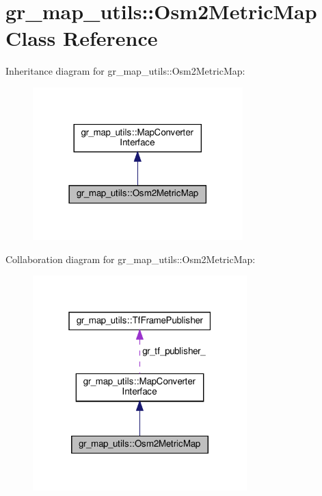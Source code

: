 \hypertarget{classgr__map__utils_1_1Osm2MetricMap}{}\section{gr\+\_\+map\+\_\+utils\+:\+:Osm2\+Metric\+Map Class Reference}
\label{classgr__map__utils_1_1Osm2MetricMap}


Inheritance diagram for gr\+\_\+map\+\_\+utils\+:\+:Osm2\+Metric\+Map\+:
\nopagebreak
\begin{figure}[H]
\begin{center}
\leavevmode
\includegraphics[width=230pt]{classgr__map__utils_1_1Osm2MetricMap__inherit__graph}
\end{center}
\end{figure}


Collaboration diagram for gr\+\_\+map\+\_\+utils\+:\+:Osm2\+Metric\+Map\+:
\nopagebreak
\begin{figure}[H]
\begin{center}
\leavevmode
\includegraphics[width=235pt]{classgr__map__utils_1_1Osm2MetricMap__coll__graph}
\end{center}
\end{figure}
